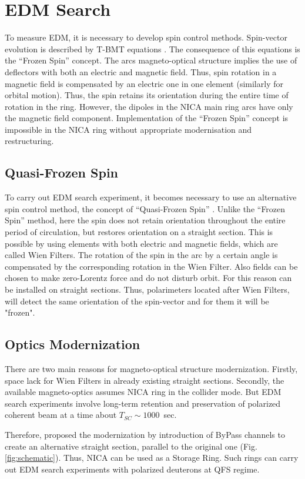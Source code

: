 \documentclass[a4paper]{jpconf}
\newcommand{\lapki}[1]{``#1''}%
\begin{document}
\section{EDM Search}

\par To measure EDM, it is necessary to develop spin control methods. Spin-vector evolution is described by T-BMT equations \cite{FS}. The consequence of this equations is the \lapki{Frozen Spin} concept. The arcs magneto-optical structure implies the use of deflectors with both an electric and magnetic field. Thus, spin rotation in a magnetic field is compensated by an electric one in one element (similarly for orbital motion). Thus, the spin retains its orientation during the entire time of rotation in the ring. However, the dipoles in the NICA main ring arcs have only the magnetic field component. Implementation of the \lapki{Frozen Spin} concept is impossible in the NICA ring without appropriate modernisation and restructuring.

\subsection{Quasi-Frozen Spin}

\par To carry out EDM search experiment, it becomes necessary to use an alternative spin control method, the concept of \lapki{Quasi-Frozen Spin} \cite{QFS}. Unlike the \lapki{Frozen Spin} method, here the spin does not retain orientation throughout the entire period of circulation, but restores orientation on a straight section. This is possible by using elements with both electric and magnetic fields, which are called Wien Filters. The rotation of the spin in the arc by a certain angle is compensated by the corresponding rotation in the Wien Filter.  Also fields can be chosen to make zero-Lorentz force and do not disturb orbit. For this reason can be installed on straight sections. Thus, polarimeters located after Wien Filters, will detect the same orientation of the spin-vector and for them it will be "frozen".

\subsection{Optics Modernization}

\par There are two main reasons for magneto-optical structure modernization. Firstly, space lack for Wien Filters in already existing straight sections. Secondly, the available magneto-optics assumes NICA ring in the collider mode. But EDM search experiments involve long-term retention and preservation of polarized coherent beam at a time about $T_{SC}\sim1000$~sec.
\par Therefore, proposed the modernization by introduction of ByPass channels to create an alternative straight section, parallel to the original one (Fig. \ref{fig:schematic}). Thus, NICA can be used as a Storage Ring. Such rings can carry out EDM search experiments with polarized deuterons at QFS regime.
\end{document}
